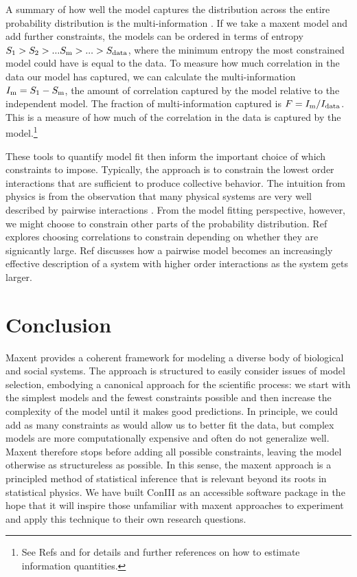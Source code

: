 \documentclass[aps,prl,twocolumn,nofootinbib]{revtex4-1}
\begin{document}
A summary of how well the model captures the distribution across the entire probability distribution is the multi-information \cite{Nemenman:2004wz,Schneidman:2006he}. If we take a maxent model and add further constraints, the models can be ordered in terms of entropy $S_{\rm 1}>S_{2}>...S_{\rm m}>...>S_{\rm data}$, where the minimum entropy the most constrained model could have is equal to the data. To measure how much correlation in the data our model has captured, we can calculate the multi-information $I_{\rm m} = S_{\rm 1}-S_{\rm m}$, the amount of correlation captured by the model relative to the independent model. The fraction of multi-information captured is $F=I_{\rm m}/I_{\rm data}$. This is a measure of how much of the correlation in the data is captured by the model.\footnote{See Refs \cite{Bialek:2012ueb} and \cite{Lee:2015ev} for details and further references on how to estimate information quantities.}

These tools to quantify model fit then inform the important choice of which constraints to impose. Typically, the approach is to constrain the lowest order interactions that are sufficient to produce collective behavior. The intuition from physics is from the observation that many physical systems are very well described by pairwise interactions \cite{Ranganathan:2007wz}.
From the model fitting perspective, however, we might choose to constrain other parts of the probability distribution. Ref \cite{Ganmor:2011ct} explores choosing correlations to constrain depending on whether they are signicantly large. Ref \cite{Nemenman:2016kl} discusses how a pairwise model becomes an increasingly effective description of a system with higher order interactions as the system gets larger.



\section{Conclusion}
Maxent provides a coherent framework for modeling a diverse body of biological and social systems.  The approach is structured to easily consider issues of model selection,  embodying a canonical approach for the scientific process: we start with the simplest models and the fewest constraints possible and then increase the complexity of the model until it makes good predictions. In principle, we could add as many constraints as would allow us to better fit the data, but complex models are more computationally expensive and often do not generalize well.  Maxent therefore stops before adding all possible constraints, leaving the model otherwise as structureless as possible.
In this sense, the maxent approach is a principled method of statistical inference that is relevant beyond its roots in statistical physics.  We have built ConIII as an accessible software package in the hope that it will inspire those unfamiliar with maxent approaches to experiment and apply this technique to their own research questions.
\end{document}
